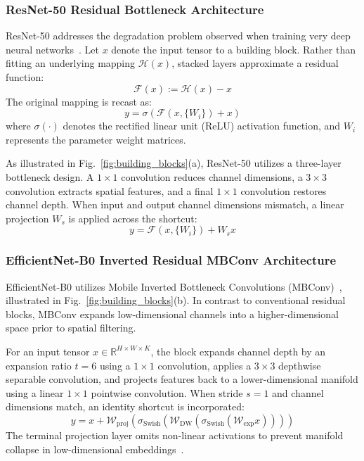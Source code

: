 \documentclass[journal]{IEEEtran}
\begin{document}
\subsubsection{ResNet-50 Residual Bottleneck Architecture}
ResNet-50 addresses the degradation problem observed when training very deep neural networks~\cite{he2016}. Let $x$ denote the input tensor to a building block. Rather than fitting an underlying mapping $\mathcal{H}(x)$, stacked layers approximate a residual function:
\begin{equation}
\mathcal{F}(x) := \mathcal{H}(x) - x
\end{equation}
The original mapping is recast as:
\begin{equation}
y = \sigma\left(\mathcal{F}(x, \{W_i\}) + x\right)
\end{equation}
where $\sigma(\cdot)$ denotes the rectified linear unit (ReLU) activation function, and $W_i$ represents the parameter weight matrices. 

As illustrated in Fig.~\ref{fig:building_blocks}(a), ResNet-50 utilizes a three-layer bottleneck design. A $1\times 1$ convolution reduces channel dimensions, a $3\times 3$ convolution extracts spatial features, and a final $1\times 1$ convolution restores channel depth. When input and output channel dimensions mismatch, a linear projection $W_s$ is applied across the shortcut:
\begin{equation}
y = \mathcal{F}(x, \{W_i\}) + W_s x
\end{equation}

\subsubsection{EfficientNet-B0 Inverted Residual MBConv Architecture}
EfficientNet-B0 utilizes Mobile Inverted Bottleneck Convolutions (MBConv)~\cite{sandler2018, tan2019}, illustrated in Fig.~\ref{fig:building_blocks}(b). In contrast to conventional residual blocks, MBConv expands low-dimensional channels into a higher-dimensional space prior to spatial filtering.

For an input tensor $x \in \mathbb{R}^{H \times W \times K}$, the block expands channel depth by an expansion ratio $t=6$ using a $1\times 1$ convolution, applies a $3\times 3$ depthwise separable convolution, and projects features back to a lower-dimensional manifold using a linear $1\times 1$ pointwise convolution. When stride $s=1$ and channel dimensions match, an identity shortcut is incorporated:
\begin{equation}
y = x + \mathcal{W}_{\text{proj}}\left( \sigma_{\text{Swish}}\left( \mathcal{W}_{\text{DW}}\left( \sigma_{\text{Swish}}\left( \mathcal{W}_{\text{exp}} x \right) \right) \right) \right)
\end{equation}
The terminal projection layer omits non-linear activations to prevent manifold collapse in low-dimensional embeddings~\cite{sandler2018}.
\end{document}
